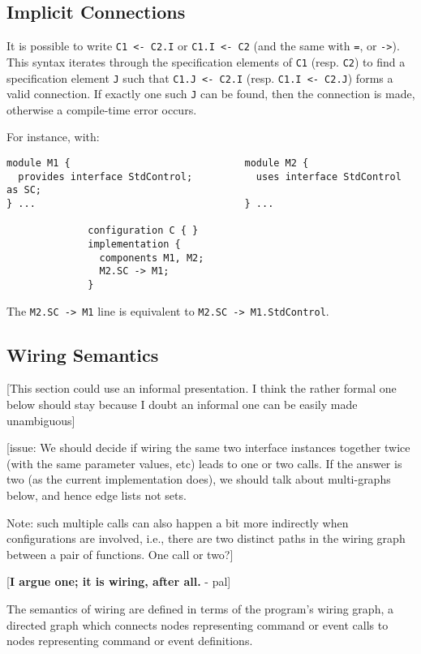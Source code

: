 \documentclass[11pt]{article}
\newcommand{\kw}[1]{{\tt #1}}
\newcommand{\code}[1]{{\tt #1}}
\begin{document}
\subsection{Implicit Connections}
\label{sec:implicit}

It is possible to write \code{C1 <- C2.I} or \code{C1.I <- C2} (and the
same with \kw{=}, or \kw{->}). This syntax iterates through the
specification elements of \code{C1} (resp. \code{C2}) to find a
specification element \code{J} such that \code{C1.J <- C2.I}
(resp. \code{C1.I <- C2.J}) forms a valid connection. If exactly one such
\code{J} can be found, then the connection is made, otherwise a
compile-time error occurs.

For instance, with:
\begin{verbatim}
module M1 {                              module M2 {
  provides interface StdControl;           uses interface StdControl as SC;
} ...                                    } ...

              configuration C { }
              implementation {
                components M1, M2;
                M2.SC -> M1;
              }
\end{verbatim}
The \code{M2.SC -> M1} line is equivalent to \code{M2.SC -> M1.StdControl}.

\subsection{Wiring Semantics}
\label{sec:wiring}

[This section could use an informal presentation. I think the rather
formal one below should stay because I doubt an informal one can be
easily made unambiguous]

[issue: We should decide if wiring the same two interface instances
together twice (with the same parameter values, etc) leads to one or two
calls. If the answer is two (as the current implementation does), we should
talk about multi-graphs below, and hence edge lists not sets.

Note: such multiple calls can also happen a bit more indirectly when
configurations are involved, i.e., there are two distinct paths in
the wiring graph between a pair of functions. One call or two?]

[{\bf I argue one; it is wiring, after all.} - pal]

The semantics of wiring are defined in terms of the program's wiring graph,
a directed graph which connects nodes representing command or event calls
to nodes representing command or event definitions.
\end{document}
